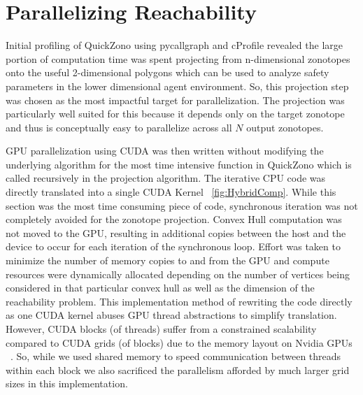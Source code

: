 \documentclass[runningheads]{llncs}
\begin{document}
\section{Parallelizing Reachability}
\label{sec:Parallelizing Reachability}
Initial profiling of QuickZono using pycallgraph and cProfile revealed the large portion of computation time was spent projecting from n-dimensional zonotopes onto the useful 2-dimensional polygons which can be used to analyze safety parameters in the lower dimensional agent environment. So, this projection step was chosen as the most impactful target for parallelization. The projection was particularly well suited for this because it depends only on the target zonotope and thus is conceptually easy to parallelize across all $N$ output zonotopes.

GPU parallelization using CUDA was then written without modifying the underlying algorithm for the most time intensive function in QuickZono which is called recursively in the projection algorithm. The iterative CPU code was directly translated into a single CUDA Kernel ~\ref{fig:HybridComp}. While this section was the most time consuming piece of code, synchronous iteration was not completely avoided for the zonotope projection. Convex Hull computation was not moved to the GPU, resulting in additional copies between the host and the device to occur for each iteration of the synchronous loop. 
Effort was taken to minimize the number of memory copies to and from the GPU and compute resources were dynamically allocated depending on the number of vertices being considered in that particular convex hull as well as the dimension of the reachability problem. 
This implementation method of rewriting the code directly as one CUDA kernel abuses GPU thread abstractions to simplify translation. 
However, CUDA blocks (of threads) suffer from a constrained scalability compared to CUDA grids (of blocks) due to the memory layout on Nvidia GPUs ~\cite{cuda}. 
So, while we used shared memory to speed communication between threads within each block we also sacrificed the parallelism afforded by much larger grid sizes in this implementation.
\end{document}
